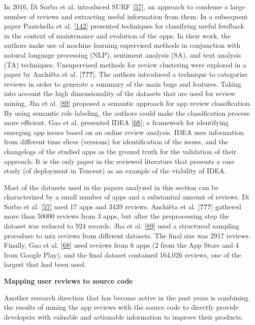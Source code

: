 \documentclass[]{book}
\begin{document}
In 2016, Di Sorbo et al. introduced SURF
{[}\protect\hyperlink{ref-di2016would}{57}{]}, an approach to condense a
large number of reviews and extracting useful information from them. In
a subsequent paper Panichella et al.
{[}\protect\hyperlink{ref-panichella2016ardoc}{142}{]} presented
techniques for classifying useful feedback in the context of maintenance
and evolution of the apps. In their work, the authors make use of
machine learning supervised methods in conjunction with natural language
processing (NLP), sentiment analysis (SA), and text analysis (TA)
techniques. Unsupervised methods for review clustering were explored in
a paper by Anchiêta et al. {[}{\textbf{???}}{]}. The authors introduced
a technique to categorize reviews in order to generate a summary of the
main bugs and features. Taking into account the high dimensionality of
the datasets that are used for review mining, Jha et al.
{[}\protect\hyperlink{ref-jha2017mining}{89}{]} proposed a semantic
approach for app review classification. By using semantic role labeling,
the authors could make the classification process more efficient. Gao et
al. presented IDEA {[}\protect\hyperlink{ref-gao2018online}{68}{]}; a
framework for identifying emerging app issues based on an online review
analysis. IDEA uses information from different time slices (versions)
for identification of the issues, and the changelogs of the studied apps
as the ground truth for the validation of their approach. It is the only
paper in the reviewed literature that presents a case study (of
deployment in Tencent) as an example of the viability of IDEA.

Most of the datasets used in the papers analyzed in this section can be
characterized by a small number of apps and a substantial amount of
reviews. Di Sorbo et al. {[}\protect\hyperlink{ref-di2016would}{57}{]}
used 17 apps and 3439 reviews. Anchiêta et al. {[}{\textbf{???}}{]}
gathered more than 50000 reviews from 3 apps, but after the
preprocessing step the dataset was reduced to 924 records. Jha et al.
{[}\protect\hyperlink{ref-jha2017mining}{89}{]} used a structured
sampling procedure to mix reviews from different datasets. The final
size was 2917 reviews. Finally, Gao et al.
{[}\protect\hyperlink{ref-gao2018online}{68}{]} used reviews from 6 apps
(2 from the App Store and 4 from Google Play), and the final dataset
contained 164,026 reviews, one of the largest that had been used.

\textbf{Mapping user reviews to source code}

Another research direction that has become active in the past years is
combining the results of mining the app reviews with the source code to
directly provide developers with valuable and actionable information to
improve their products.
\end{document}
